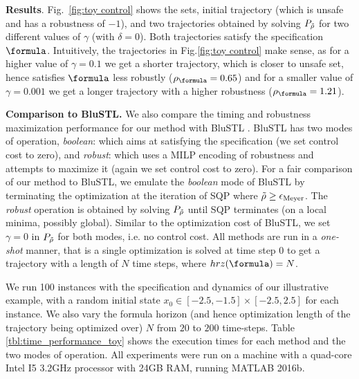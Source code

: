 \textbf{Results}.
Fig.~\ref{fig:toy control} shows the sets, initial trajectory (which is unsafe and has a robustness of $-1$), and two trajectories obtained by solving $P_{\tilde{\rho}}$ for two different values of $\gamma$ (with $\delta=0$). Both trajectories satisfy the specification $\formula$. Intuitively, the trajectories in Fig.\ref{fig:toy control} make sense, as for a higher value of $\gamma=0.1$ we get a shorter trajectory, which is closer to unsafe set, hence satisfies $\formula$ less robustly ($\rob_{\formula}=0.65$) and for a smaller value of $\gamma=0.001$ we get a longer trajectory with a higher robustness ($\rob_{\formula}=1.21$).

\textbf{Comparison to BluSTL.}
We also compare the timing and robustness maximization performance for our method with BluSTL \cite{}. BluSTL has two modes of operation, \textit{boolean}: which aims at satisfying the specification (we set control cost to zero), and \textit{robust}: which uses a MILP encoding of robustness and attempts to maximize it (again we set control cost to zero). For a fair comparison of our method to BluSTL, we emulate the \textit{boolean} mode of BluSTL by terminating the optimization at the iteration of SQP where $\tilde{\rho} \geq \epsilon_{\text{Meyer}}$. The \textit{robust} operation is obtained by solving $P_{\tilde{\rho}}$ until SQP terminates (on a local minima, possibly global). Similar to the optimization cost of BluSTL, we set $\gamma=0$ in $P_{\tilde{\rho}}$ for both modes, i.e. no control cost. All methods are run in a \textit{one-shot} manner, that is a single optimization is solved at time step $0$ to get a trajectory with a length of $N$ time steps, where $hrz(\formula) = N$.

We run 100 instances with the specification and dynamics of our illustrative example, with a random initial state $x_0 \in [-2.5,-1.5] \times [-2.5,2.5]$ for each instance. We also vary the formula horizon (and hence optimization length of the trajectory being optimized over) $N$ from $20$ to $200$ time-steps. Table \ref{tbl:time_performance_toy} shows the execution times for each method and the two modes of operation. All experiments were run on a machine with a quad-core Intel I5 3.2GHz processor with 24GB RAM, running MATLAB 2016b.


